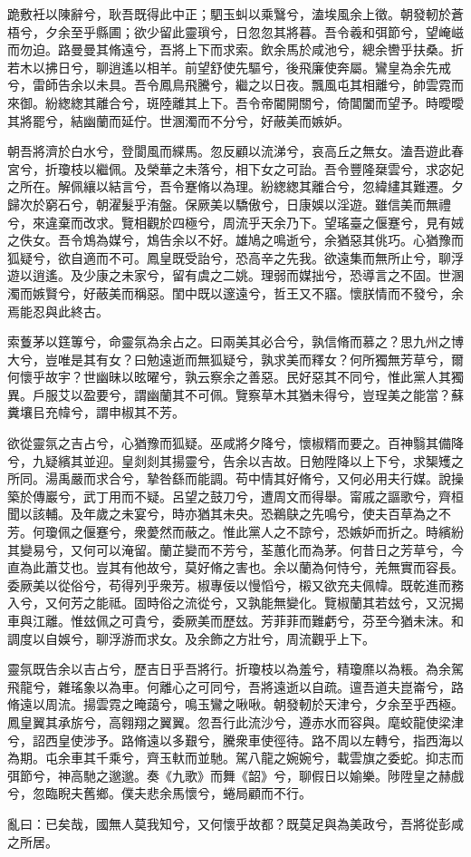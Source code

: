 \begin{pinyinscope}
跪敷衽以陳辭兮，耿吾既得此中正；駟玉虯以乘鷖兮，溘埃風余上徵。朝發軔於蒼梧兮，夕余至乎縣圃；欲少留此靈瑣兮，日忽忽其將暮。吾令羲和弭節兮，望崦嵫而勿迫。路曼曼其脩遠兮，吾將上下而求索。飲余馬於咸池兮，總余轡乎扶桑。折若木以拂日兮，聊逍遙以相羊。前望舒使先驅兮，後飛廉使奔屬。鸞皇為余先戒兮，雷師告余以未具。吾令鳳鳥飛騰兮，繼之以日夜。飄風屯其相離兮，帥雲霓而來御。紛緫緫其離合兮，斑陸離其上下。吾令帝閽開關兮，倚閶闔而望予。時曖曖其將罷兮，結幽蘭而延佇。世溷濁而不分兮，好蔽美而嫉妒。

朝吾將濟於白水兮，登閬風而緤馬。忽反顧以流涕兮，哀高丘之無女。溘吾遊此春宮兮，折瓊枝以繼佩。及榮華之未落兮，相下女之可詒。吾令豐隆椉雲兮，求宓妃之所在。解佩纕以結言兮，吾令蹇脩以為理。紛緫緫其離合兮，忽緯繣其難遷。夕歸次於窮石兮，朝濯髮乎洧盤。保厥美以驕傲兮，日康娛以淫遊。雖信美而無禮兮，來違棄而改求。覽相觀於四極兮，周流乎天余乃下。望瑤臺之偃蹇兮，見有娀之佚女。吾令鴆為媒兮，鴆告余以不好。雄鳩之鳴逝兮，余猶惡其佻巧。心猶豫而狐疑兮，欲自適而不可。鳳皇既受詒兮，恐高辛之先我。欲遠集而無所止兮，聊浮遊以逍遙。及少康之未家兮，留有虞之二姚。理弱而媒拙兮，恐導言之不固。世溷濁而嫉賢兮，好蔽美而稱惡。閨中既以邃遠兮，哲王又不寤。懷朕情而不發兮，余焉能忍與此終古。

索藑茅以筳篿兮，命靈氛為余占之。曰兩美其必合兮，孰信脩而慕之？思九州之博大兮，豈唯是其有女？曰勉遠逝而無狐疑兮，孰求美而釋女？何所獨無芳草兮，爾何懷乎故宇？世幽昧以昡曜兮，孰云察余之善惡。民好惡其不同兮，惟此黨人其獨異。戶服艾以盈要兮，謂幽蘭其不可佩。覽察草木其猶未得兮，豈珵美之能當？蘇糞壤㠯充幃兮，謂申椒其不芳。

欲從靈氛之吉占兮，心猶豫而狐疑。巫咸將夕降兮，懷椒糈而要之。百神翳其備降兮，九疑繽其並迎。皇剡剡其揚靈兮，告余以吉故。日勉陞降以上下兮，求榘矱之所同。湯禹嚴而求合兮，摯咎繇而能調。苟中情其好脩兮，又何必用夫行媒。說操築於傳巖兮，武丁用而不疑。呂望之鼓刀兮，遭周文而得舉。甯戚之謳歌兮，齊桓聞以該輔。及年歲之未宴兮，時亦猶其未央。恐鵜鴃之先鳴兮，使夫百草為之不芳。何瓊佩之偃蹇兮，衆薆然而蔽之。惟此黨人之不諒兮，恐嫉妒而折之。時繽紛其變易兮，又何可以淹留。蘭芷變而不芳兮，荃蕙化而為茅。何昔日之芳草兮，今直為此蕭艾也。豈其有他故兮，莫好脩之害也。余以蘭為何恃兮，羌無實而容長。委厥美以從俗兮，苟得列乎衆芳。椒專佞以慢慆兮，樧又欲充夫佩幃。既乾進而務入兮，又何芳之能祗。固時俗之流從兮，又孰能無變化。覽椒蘭其若玆兮，又況揭車與江離。惟玆佩之可貴兮，委厥美而歷玆。芳菲菲而難虧兮，芬至今猶未沫。和調度以自娛兮，聊浮游而求女。及余飾之方壯兮，周流觀乎上下。

靈氛既告余以吉占兮，歷吉日乎吾將行。折瓊枝以為羞兮，精瓊爢以為粻。為余駕飛龍兮，雜瑤象以為車。何離心之可同兮，吾將遠逝以自疏。邅吾道夫崑崙兮，路脩遠以周流。揚雲霓之晻藹兮，鳴玉鸞之啾啾。朝發軔於天津兮，夕余至乎西極。鳳皇翼其承旂兮，高翱翔之翼翼。忽吾行此流沙兮，遵赤水而容與。麾蛟龍使梁津兮，詔西皇使涉予。路脩遠以多艱兮，騰衆車使徑待。路不周以左轉兮，指西海以為期。屯余車其千乘兮，齊玉軑而並馳。駕八龍之婉婉兮，載雲旗之委蛇。抑志而弭節兮，神高馳之邈邈。奏《九歌》而舞《韶》兮，聊假日以媮樂。陟陞皇之赫戲兮，忽臨睨夫舊鄉。僕夫悲余馬懷兮，蜷局顧而不行。

亂曰：已矣哉，國無人莫我知兮，又何懷乎故都？既莫足與為美政兮，吾將從彭咸之所居。


\end{pinyinscope}